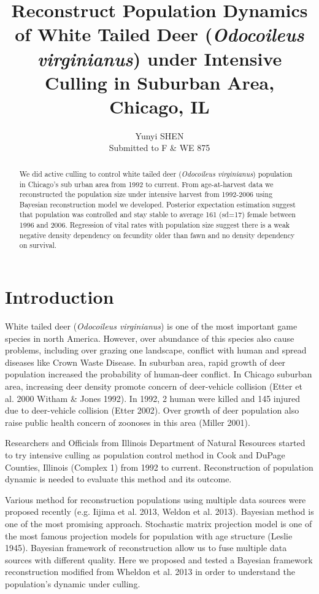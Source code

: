 \documentclass[]{article}
\title{Reconstruct Population Dynamics of White Tailed Deer (\textit{Odocoileus virginianus}) under Intensive Culling in Suburban Area, Chicago, IL}
\author{Yunyi SHEN\\
Submitted to F \& WE 875}
\begin{document}
\maketitle

\begin{abstract}
	We did active culling to control white tailed deer (\textit{Odocoileus virginianus}) population in Chicago's sub urban area from 1992 to current. From age-at-harvest data we reconstructed the population size under intensive harvest from 1992-2006 using Bayesian reconstruction model we developed. Posterior expectation estimation suggest that population was controlled and stay stable to average 161 (sd=17) female between 1996 and 2006. Regression of vital rates with population size suggest there is a weak negative density dependency on fecundity older than fawn and no density dependency on survival.
\end{abstract}

\section{Introduction}
White tailed deer (\textit{Odocoileus virginianus}) is one of the most important game species in north America. However, over abundance of this species also cause problems, including over grazing one landscape, conflict with human and spread diseases like Crown Waste Disease. In suburban area, rapid growth of deer population increased the probability of human-deer conflict. In Chicago suburban area, increasing deer density promote concern of deer-vehicle collision (Etter et al. 2000 Witham \& Jones 1992). In 1992, 2 human were killed and 145 injured due to deer-vehicle collision (Etter 2002). Over growth of deer population also raise public health concern of zoonoses in this area (Miller 2001). 


Researchers and Officials from Illinois Department of Natural Resources started to try intensive culling as population control method in Cook and DuPage Counties, Illinois (Complex 1) from 1992 to current. Reconstruction of population dynamic is needed to evaluate this method and its outcome.

Various method for reconstruction populations using multiple data sources were proposed recently (e.g. Iijima et al. 2013, Weldon et al. 2013). Bayesian method is one of the most promising approach. Stochastic matrix projection model is one of the most famous projection models for population with age structure (Leslie 1945). Bayesian framework of reconstruction allow us to fuse multiple data sources with different quality. Here we proposed and tested a Bayesian framework reconstruction modified from Wheldon et al. 2013 in order to understand the population's dynamic under culling. 
\end{document}

